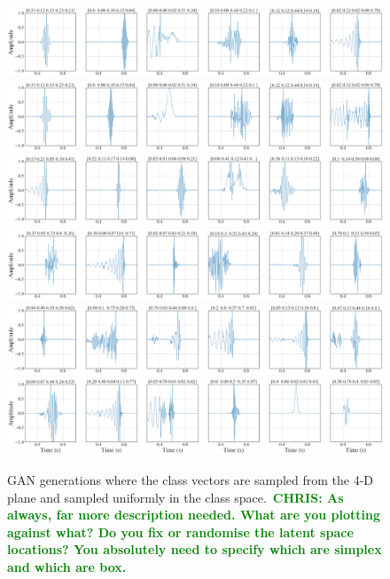 \documentclass[12pt]{iopart}
\newcommand{\chris}[1]{\textbf{\textcolor{green}{CHRIS: #1}}}
\begin{document}
\begin{figure}
    \centering
    \includegraphics[width=\textwidth]{figures/generations/simplex_sample1.png}
    \includegraphics[width=\textwidth]{figures/generations/simplex_sample2.png}
    \includegraphics[width=\textwidth]{figures/generations/simplex_sample3.png}
    \includegraphics[width=\textwidth]{figures/generations/uniform_sample3.png}
    \includegraphics[width=\textwidth]{figures/generations/uniform_sample2.png}
    \includegraphics[width=\textwidth]{figures/generations/uniform_sample1.png}
    \caption{GAN generations where the class vectors are sampled from the 4-D
plane and sampled uniformly in the class space.~\chris{As always, far more
description needed. What are you plotting against what? Do you fix or randomise
the latent space locations? You absolutely need to specify which are simplex
and which are box.}}
    \label{fig:unmodelled_samples}
\end{figure}
\end{document}
